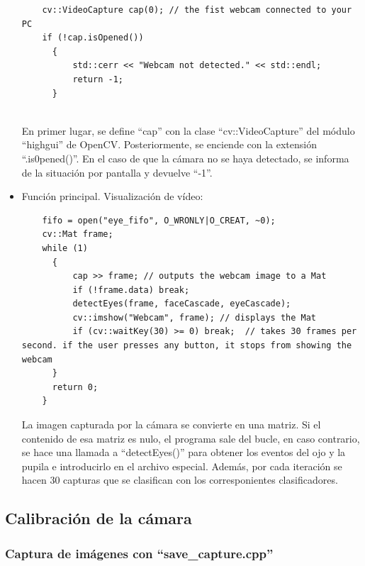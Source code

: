 \begin{itemize}
\begin{verbatim}
    cv::VideoCapture cap(0); // the fist webcam connected to your PC
    if (!cap.isOpened())
      {
          std::cerr << "Webcam not detected." << std::endl;
          return -1;
      }  
    
    \end{verbatim} 
    
    En primer lugar, se define ``cap'' con la clase ``cv::VideoCapture'' del módulo ``highgui'' de OpenCV. Posteriormente, se enciende con la extensión ``.is0pened()''. En el caso de que la cámara no se haya detectado, se informa de la situación por pantalla y devuelve ``-1''.
    
    
    \item Función principal. Visualización de vídeo: \\
    
    \begin{verbatim} 
    fifo = open("eye_fifo", O_WRONLY|O_CREAT, ~0);
    cv::Mat frame;
    while (1)
      {
          cap >> frame; // outputs the webcam image to a Mat
          if (!frame.data) break;
          detectEyes(frame, faceCascade, eyeCascade);
          cv::imshow("Webcam", frame); // displays the Mat
          if (cv::waitKey(30) >= 0) break;  // takes 30 frames per second. if the user presses any button, it stops from showing the webcam
      }
      return 0;
    }
    \end{verbatim} 
    
La imagen capturada por la cámara se convierte en una matriz. Si el contenido de esa matriz es nulo, el programa sale del bucle, en caso contrario, se hace una llamada a ``detectEyes()'' para obtener los eventos del ojo y la pupila e introducirlo en el archivo especial. Además, por cada iteración se hacen 30 capturas que se clasifican con los corresponientes clasificadores. 
    
\end{itemize}

\subsection{Calibración de la cámara} \label{s3_2_2}

\subsubsection{Captura de imágenes con ``save\_capture.cpp''}\label{s3_2_2_1}

